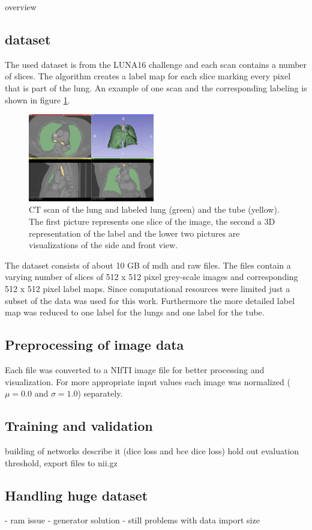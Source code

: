 
overview

\subsection{dataset}

The used dataset is from the LUNA16 challenge and each scan contains a number of slices. The algorithm creates a label map for each slice marking every pixel that is part of the lung. An example of one scan and the corresponding labeling is shown in figure \ref{scan_picture}.

\begin{figure}[h!]
	\includegraphics[width=0.49\textwidth, angle=0]{files/Fulllayoutprediction.png}
	\caption{CT scan of the lung and labeled lung (green) and the tube (yellow). The first picture represents one slice of the image, the second a 3D representation of the label and the lower two pictures are visualizations of the side and front view.}
	\label{scan_picture}
\end{figure}

The dataset consists of about 10 GB of mdh and raw files. The files contain a varying number of slices of 512 x 512 pixel grey-scale images and corresponding 512 x 512 pixel label maps. Since computational resources were limited just a subset of the data was used for this work. Furthermore the more detailed label map was reduced to one label for the lungs and one label for the tube.

\subsection{Preprocessing of image data}
Each file was converted to a NIfTI image file for better processing and visualization. For more appropriate input values each image was normalized ($\mu = 0.0$ and $\sigma = 1.0$) separately.

\subsection{Training and validation}

building of networks
describe it (dice loss and bce dice loss)
hold out evaluation
threshold, export files to nii.gz

\subsection{Handling huge dataset}
- ram issue
- generator solution
- still problems with data import size



